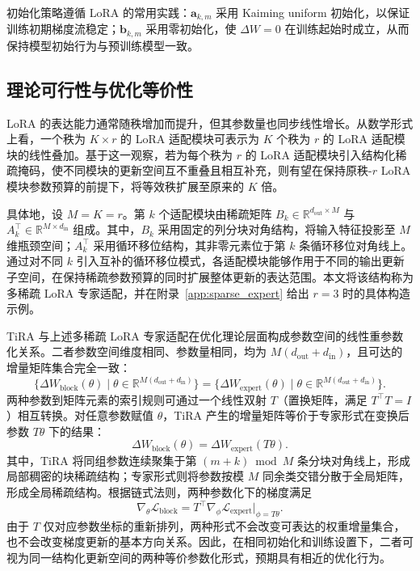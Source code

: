 \documentclass[UTF8,a4paper,11pt]{ctexart}
\newcommand{\R}{\mathbb{R}}
\newcommand{\DeltaW}{\Delta W}
\begin{document}
初始化策略遵循 LoRA 的常用实践：$\bm{a}_{k,m}$ 采用 Kaiming uniform 初始化\cite{he2015rectifier}，以保证训练初期梯度流稳定；$\bm{b}_{k,m}$ 采用零初始化，使 $\DeltaW=0$ 在训练起始时成立，从而保持模型初始行为与预训练模型一致。

\subsection{理论可行性与优化等价性}

LoRA 的表达能力通常随秩增加而提升，但其参数量也同步线性增长。从数学形式上看，一个秩为 $K\times r$ 的 LoRA 适配模块可表示为 $K$ 个秩为 $r$ 的 LoRA 适配模块的线性叠加。基于这一观察，若为每个秩为 $r$ 的 LoRA 适配模块引入结构化稀疏掩码，使不同模块的更新空间互不重叠且相互补充，则有望在保持原秩-$r$ LoRA 模块参数预算的前提下，将等效秩扩展至原来的 $K$ 倍。

具体地，设 $M=K=r$。第 $k$ 个适配模块由稀疏矩阵 $B_k\in\R^{d_{\mathrm{out}}\times M}$ 与 $A_k^{\top}\in\R^{M\times d_{\mathrm{in}}}$ 组成。其中，$B_k$ 采用固定的列分块对角结构，将输入特征投影至 $M$ 维瓶颈空间；$A_k^{\top}$ 采用循环移位结构，其非零元素位于第 $k$ 条循环移位对角线上。通过对不同 $k$ 引入互补的循环移位模式，各适配模块能够作用于不同的输出更新子空间，在保持稀疏参数预算的同时扩展整体更新的表达范围。本文将该结构称为多稀疏 LoRA 专家适配，并在附录~\ref{app:sparse_expert} 给出 $r=3$ 时的具体构造示例。

TiRA 与上述多稀疏 LoRA 专家适配在优化理论层面构成参数空间的线性重参数化关系。二者参数空间维度相同、参数量相同，均为 $M(d_{\mathrm{out}}+d_{\mathrm{in}})$，且可达的增量矩阵集合完全一致：
\begin{equation}
    \{\Delta W_{\mathrm{block}}(\theta)\mid \theta\in\R^{M(d_{\mathrm{out}}+d_{\mathrm{in}})}\}
    =
    \{\Delta W_{\mathrm{expert}}(\theta)\mid \theta\in\R^{M(d_{\mathrm{out}}+d_{\mathrm{in}})}\}.
\end{equation}
两种参数到矩阵元素的索引规则可通过一个线性双射 $T$（置换矩阵，满足 $T^{\top}T=I$）相互转换。对任意参数赋值 $\theta$，TiRA 产生的增量矩阵等价于专家形式在变换后参数 $T\theta$ 下的结果：
\begin{equation}
    \Delta W_{\mathrm{block}}(\theta)=\Delta W_{\mathrm{expert}}(T\theta).
\end{equation}
其中，TiRA 将同组参数连续聚集于第 $(m+k)\bmod M$ 条分块对角线上，形成局部稠密的块稀疏结构；专家形式则将参数按模 $M$ 同余类交错分散于全局矩阵，形成全局稀疏结构。根据链式法则，两种参数化下的梯度满足
\begin{equation}
    \nabla_{\theta}\mathcal{L}_{\mathrm{block}}
    =T^{\top}\nabla_{\phi}\mathcal{L}_{\mathrm{expert}}\big|_{\phi=T\theta}.
\end{equation}
由于 $T$ 仅对应参数坐标的重新排列，两种形式不会改变可表达的权重增量集合，也不会改变梯度更新的基本方向关系。因此，在相同初始化和训练设置下，二者可视为同一结构化更新空间的两种等价参数化形式，预期具有相近的优化行为。
\end{document}
